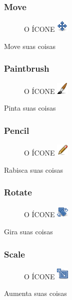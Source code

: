 \documentclass[12pt,onecolumn]{article}
\begin{document}
    \subsubsection{Move}
      \begin{figure}[H]
        O ÍCONE
        \includegraphics{gimp-icons/stock-tool-move-22.png}
        \label{fig:move}
      \end{figure}
      Move suas coisas

    \subsubsection{Paintbrush}
      \begin{figure}[H]
        O ÍCONE
        \includegraphics{gimp-icons/stock-tool-paintbrush-22.png}
        \label{fig:brush}
      \end{figure}
      Pinta suas coisas
      
    \subsubsection{Pencil}
      \begin{figure}[H]
        O ÍCONE
        \includegraphics{gimp-icons/stock-tool-pencil-22.png}
        \label{fig:pencil}
      \end{figure}
      Rabisca suas coisas
      
    \subsubsection{Rotate}
      \begin{figure}[H]
        O ÍCONE
        \includegraphics{gimp-icons/stock-tool-rotate-22.png}
        \label{fig:rotate}
      \end{figure}
      Gira suas coisas
      
    \subsubsection{Scale}
      \begin{figure}[H]
        O ÍCONE
        \includegraphics{gimp-icons/stock-tool-scale-22.png}
        \label{fig:scale}
      \end{figure}
      Aumenta suas coisas
\end{document}
